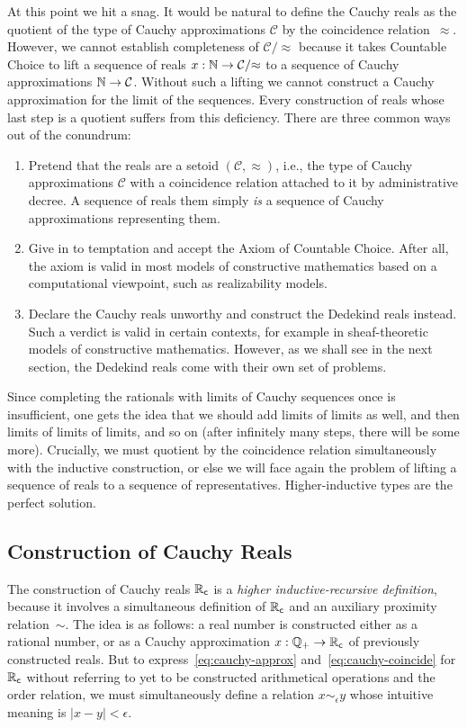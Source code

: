 At this point we hit a snag. It would be natural to define the Cauchy reals as the
quotient of the type of Cauchy approximations $\mathcal{C}$ by the coincidence
relation~$\approx$. However, we cannot establish completeness of $\mathcal{C}/{\approx}$
because it takes Countable Choice to lift a sequence of reals $x : \mathbb{N} \to
\mathcal{C}/{\approx}$ to a sequence of Cauchy approximations $\mathbb{N} \to \mathcal{C}$.
Without such a lifting we cannot construct a Cauchy approximation for the limit of the
sequences. Every construction of reals whose last step is a quotient suffers from this
deficiency. There are three common ways out of the conundrum:
%
\begin{enumerate}
\item Pretend that the reals are a setoid $(\mathcal{C}, {\approx})$, i.e., the type of
  Cauchy approximations $\mathcal{C}$ with a coincidence relation attached to it by
  administrative decree. A sequence of reals them simply \emph{is} a sequence of Cauchy
  approximations representing them.
\item Give in to temptation and accept the Axiom of Countable Choice. After all, the axiom
  is valid in most models of constructive mathematics based on a computational viewpoint,
  such as realizability models.
\item Declare the Cauchy reals unworthy and construct the Dedekind reals instead. Such a
  verdict is valid in certain contexts, for example in sheaf-theoretic models of
  constructive mathematics. However, as we shall see in the next section, the Dedekind
  reals come with their own set of problems.
\end{enumerate}
%
Since completing the rationals with limits of Cauchy sequences once is insufficient, one
gets the idea that we should add limits of limits as well, and then limits of limits of
limits, and so on (after infinitely many steps, there will be some more). Crucially, we
must quotient by the coincidence relation simultaneously with the inductive construction,
or else we will face again the problem of lifting a sequence of reals to a sequence of
representatives. Higher-inductive types are the perfect solution.

\subsection{Construction of Cauchy Reals}
\label{sec:constr-cauchy-reals}

The construction of Cauchy reals $\mathbb{R}_\mathsf{c}$ is a \emph{higher inductive-recursive definition},
because it involves a simultaneous definition of $\mathbb{R}_\mathsf{c}$ and an auxiliary proximity
relation~$\sim$. The idea is as follows: a real number is constructed either as a rational
number, or as a Cauchy approximation $x : \mathbb{Q}_{+} \to \mathbb{R}_\mathsf{c}$ of previously constructed reals.
But to express~\eqref{eq:cauchy-approx} and~\eqref{eq:cauchy-coincide} for $\mathbb{R}_\mathsf{c}$ without
referring to yet to be constructed arithmetical operations and the order relation, we must
simultaneously define a relation $x \sim_\epsilon y$ whose intuitive meaning is $|x - y| <
\epsilon$.


